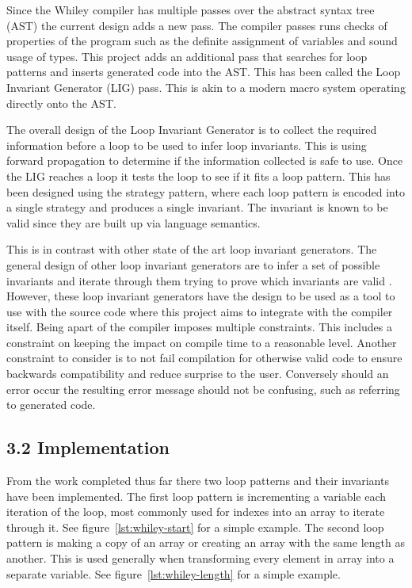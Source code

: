 \documentclass[11pt, a4paper, twoside, openright]{report}
\begin{document}
Since the Whiley compiler has multiple passes over the abstract syntax tree
(AST)
the current design adds a new pass. The compiler passes runs checks of properties
of the program such as the definite assignment of variables and sound usage of
types. This project adds an additional pass that searches for loop patterns and
inserts generated code into the AST.
This has been called the Loop Invariant Generator (LIG) pass.
This is akin to a modern macro system operating directly onto the AST.

The overall design of the Loop Invariant Generator is to collect the required
information before a loop to be used to infer loop invariants.
This is using forward propagation to determine if the
information collected is safe to use. Once the LIG reaches a loop
it tests the loop to see if it fits a loop pattern. This has been
designed using the strategy pattern, where each loop pattern is encoded
into a single strategy and produces a single invariant.
The invariant is known to be valid since they are built up via language
semantics.

This is in contrast with other state of the art loop invariant generators.
The general design of other loop invariant generators are to infer a set 
of possible invariants and iterate through them trying to prove which
invariants are valid \cite{infer-dynamic} \cite{infer-postconditions}.
However, these loop invariant generators have the design to be used as a tool
to use with the source code where this project aims to integrate with the
compiler itself. Being apart of the compiler imposes multiple constraints.
This includes a constraint on keeping the impact on compile time to a
reasonable level.
Another constraint to consider is to not fail compilation for otherwise valid
code to ensure backwards compatibility and reduce surprise to the user.
Conversely should an error occur the resulting error message should not be
confusing, such as referring to generated code.

\subsection*{3.2 Implementation}


From the work completed thus far there two loop patterns and their invariants
have been implemented. The first loop pattern is incrementing a variable
each iteration of the loop, most commonly used for indexes into an array to
iterate through it. See figure~\ref{lst:whiley-start} for a simple example.
The second loop pattern is making a copy of an array or creating an array with
the same length as another.
This is used generally when transforming every element in array into a separate
variable. See figure~\ref{lst:whiley-length} for a simple example.
\end{document}
